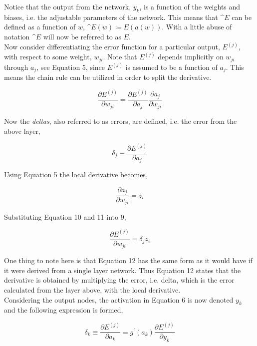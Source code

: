 \documentclass[11pt, letterpaper]{amsart}
\begin{document}
Notice that the output from the network, $y_k$, is a function of the weights and biases, i.e. the adjustable parameters of the network. This means that $\^{E}$ can be defined as a function of $w$, $\^{E}(w) \coloneqq  E(a(w))$. With a little abuse of notation $\^{E}$ will now be referred to as $E$.
\\

Now consider differentiating the error function for a particular output, $E^{(j)}$, with respect to some weight, $w_{ji}$. Note that $E^{(j)}$ depends implicitly on $w_{ji}$ through $a_j$, see Equation 5, since $E^{(j)}$ is assumed to be a function of $a_j$. This means the chain rule can be utilized in order to split the derivative.

\begin{equation}
    \frac{\partial E^{(j)}}{\partial w_{ji}} = \frac{\partial E^{(j)}}{\partial a_j} \frac{\partial a_j}{\partial w_{ji}}
\end{equation}

Now the \textit{deltas}, also referred to as errors, are defined, i.e. the error from the above layer,

\begin{equation}
    \delta_j \equiv \frac{\partial E^{(j)}}{\partial a_j}
\end{equation}

Using Equation 5 the local derivative becomes,

\begin{equation}
    \frac{\partial a_j}{\partial w_{ji}} = z_i
\end{equation}

Substituting Equation 10 and 11 into 9,

\begin{equation}
    \frac{\partial E^{(j)}}{\partial w_{ji}} = \delta_j z_i
\end{equation}

One thing to note here is that Equation 12 has the same form as it would have if it were derived from a single layer network. Thus Equation 12 states that the derivative is obtained by multiplying the error, i.e. delta, which is the error calculated from the layer above, with the local derivative.
\\

Considering the output nodes, the activation in Equation 6 is now denoted $y_k$ and the following expression is formed,

\begin{equation}
    \delta_k \equiv \frac{\partial E^{(j)}}{\partial a_k} = g^\prime(a_k) \frac{\partial E^{(j)}}{\partial y_k}
\end{equation}
\end{document}

